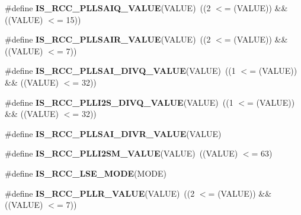 \begin{DoxyCompactItemize}
\item 
\#define {\bfseries I\+S\+\_\+\+R\+C\+C\+\_\+\+P\+L\+L\+S\+A\+I\+Q\+\_\+\+V\+A\+L\+UE}(V\+A\+L\+UE)~((2 $<$= (V\+A\+L\+UE)) \&\& ((V\+A\+L\+UE) $<$= 15))\hypertarget{group___r_c_c_ex___i_s___r_c_c___definitions_ga505ad7125d7fbf79e8520912e4bbd761}{}\label{group___r_c_c_ex___i_s___r_c_c___definitions_ga505ad7125d7fbf79e8520912e4bbd761}

\item 
\#define {\bfseries I\+S\+\_\+\+R\+C\+C\+\_\+\+P\+L\+L\+S\+A\+I\+R\+\_\+\+V\+A\+L\+UE}(V\+A\+L\+UE)~((2 $<$= (V\+A\+L\+UE)) \&\& ((V\+A\+L\+UE) $<$= 7))\hypertarget{group___r_c_c_ex___i_s___r_c_c___definitions_ga62ec96fd175b9eaa54709bf76f5a344b}{}\label{group___r_c_c_ex___i_s___r_c_c___definitions_ga62ec96fd175b9eaa54709bf76f5a344b}

\item 
\#define {\bfseries I\+S\+\_\+\+R\+C\+C\+\_\+\+P\+L\+L\+S\+A\+I\+\_\+\+D\+I\+V\+Q\+\_\+\+V\+A\+L\+UE}(V\+A\+L\+UE)~((1 $<$= (V\+A\+L\+UE)) \&\& ((V\+A\+L\+UE) $<$= 32))\hypertarget{group___r_c_c_ex___i_s___r_c_c___definitions_gade1d727f609c44d4b13a57261edffaf9}{}\label{group___r_c_c_ex___i_s___r_c_c___definitions_gade1d727f609c44d4b13a57261edffaf9}

\item 
\#define {\bfseries I\+S\+\_\+\+R\+C\+C\+\_\+\+P\+L\+L\+I2\+S\+\_\+\+D\+I\+V\+Q\+\_\+\+V\+A\+L\+UE}(V\+A\+L\+UE)~((1 $<$= (V\+A\+L\+UE)) \&\& ((V\+A\+L\+UE) $<$= 32))\hypertarget{group___r_c_c_ex___i_s___r_c_c___definitions_gac5c5714485768563fbfc6aafaf1084b7}{}\label{group___r_c_c_ex___i_s___r_c_c___definitions_gac5c5714485768563fbfc6aafaf1084b7}

\item 
\#define {\bfseries I\+S\+\_\+\+R\+C\+C\+\_\+\+P\+L\+L\+S\+A\+I\+\_\+\+D\+I\+V\+R\+\_\+\+V\+A\+L\+UE}(V\+A\+L\+UE)
\item 
\#define {\bfseries I\+S\+\_\+\+R\+C\+C\+\_\+\+P\+L\+L\+I2\+S\+M\+\_\+\+V\+A\+L\+UE}(V\+A\+L\+UE)~((V\+A\+L\+UE) $<$= 63)\hypertarget{group___r_c_c_ex___i_s___r_c_c___definitions_ga339fbc3266467ef2d551ed99b05741ad}{}\label{group___r_c_c_ex___i_s___r_c_c___definitions_ga339fbc3266467ef2d551ed99b05741ad}

\item 
\#define {\bfseries I\+S\+\_\+\+R\+C\+C\+\_\+\+L\+S\+E\+\_\+\+M\+O\+DE}(M\+O\+DE)
\item 
\#define {\bfseries I\+S\+\_\+\+R\+C\+C\+\_\+\+P\+L\+L\+R\+\_\+\+V\+A\+L\+UE}(V\+A\+L\+UE)~((2 $<$= (V\+A\+L\+UE)) \&\& ((V\+A\+L\+UE) $<$= 7))\hypertarget{group___r_c_c_ex___i_s___r_c_c___definitions_ga73abbfc3c2f9e5e3621a6d8321c88c3b}{}\label{group___r_c_c_ex___i_s___r_c_c___definitions_ga73abbfc3c2f9e5e3621a6d8321c88c3b}


\end{DoxyCompactItemize}
